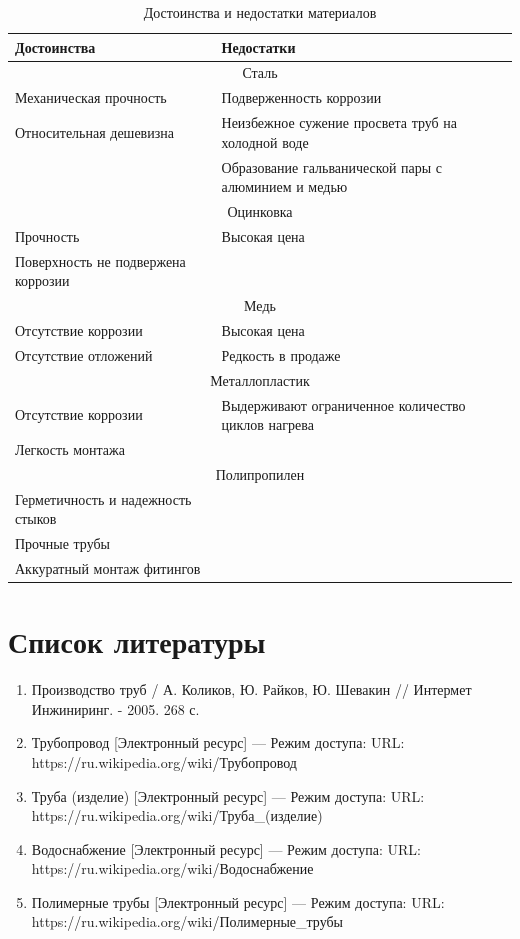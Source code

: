 \documentclass[a4paper,12pt,russian]{report}
\begin{document}
\begin{table}[!htb]
\centering
\caption{Достоинства и недостатки материалов}
\label{table:compare}
\begin{tabular}{|p{8cm}|p{8cm}|}
  \hline
  Достоинства & Недостатки \\
  \hline
  \multicolumn{2}{|c|}{Сталь} \\
  Механическая прочность & Подверженность коррозии \\
  Относительная дешевизна & Неизбежное сужение просвета труб на холодной воде \\
                          & Образование гальванической пары с алюминием и медью \\
  \multicolumn{2}{|c|}{Оцинковка} \\
  Прочность & Высокая цена \\
  Поверхность не подвержена коррозии & \\
  \multicolumn{2}{|c|}{Медь} \\
  Отсутствие коррозии & Высокая цена \\
  Отсутствие отложений & Редкость в продаже \\
  \multicolumn{2}{|c|}{Металлопластик} \\
  Отсутствие коррозии & Выдерживают ограниченное количество циклов нагрева \\
  Легкость монтажа & \\
  \multicolumn{2}{|c|}{Полипропилен} \\
  Герметичность и надежность стыков & \\
  Прочные трубы & \\
  Аккуратный монтаж фитингов & \\
  \hline
\end{tabular}
\end{table}

\section{Список литературы}

\begin{enumerate}
  \item Производство труб / А. Коликов, Ю. Райков, Ю. Шевакин // Интермет Инжиниринг. - 2005. 268 с.
  \item Трубопровод [Электронный ресурс] — Режим доступа: URL: https://ru.wikipedia.org/wiki/Трубопровод
  \item Труба (изделие) [Электронный ресурс] — Режим доступа: URL: https://ru.wikipedia.org/wiki/Труба\_(изделие)
  \item Водоснабжение [Электронный ресурс] — Режим доступа: URL: https://ru.wikipedia.org/wiki/Водоснабжение
  \item Полимерные трубы [Электронный ресурс] — Режим доступа: URL: https://ru.wikipedia.org/wiki/Полимерные\_трубы
\end{enumerate}
\end{document}

